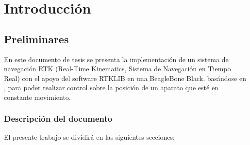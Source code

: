 
\chapter{Introducción} %

\label{Chap:Intro} %


\newcommand{\keyword}[1]{\textbf{#1}}
\newcommand{\tabhead}[1]{\textbf{#1}}
\newcommand{\code}[1]{\texttt{#1}}
\newcommand{\file}[1]{\texttt{\bfseries#1}}
\newcommand{\option}[1]{\texttt{\itshape#1}}


\section{Preliminares}
En este documento de tesis se presenta la implementación de un sistema de navegación RTK (Real-Time Kinematics, Sistema de Navegación en Tiempo Real) con el apoyo del software RTKLIB en una BeagleBone Black, basándose en \cite{takasu2009development}, para poder realizar control sobre la posición de un aparato que esté en constante movimiento.

\subsection{Descripción del documento}

El presente trabajo se dividirá en las siguientes secciones: 

